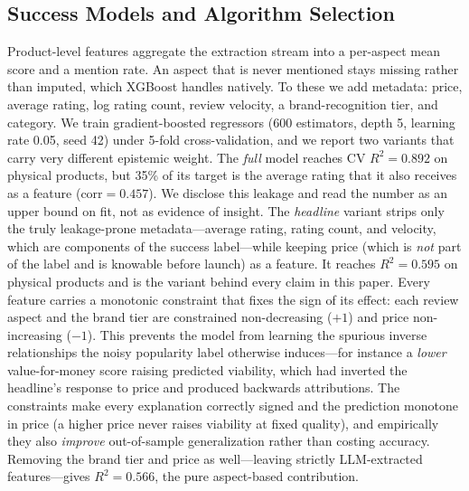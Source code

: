 \documentclass[journal]{IEEEtran}
\begin{document}
\subsection{Success Models and Algorithm Selection}
\label{sec:models}
Product-level features aggregate the extraction stream into a per-aspect mean score and a mention rate. An aspect that is never mentioned stays missing rather than imputed, which XGBoost \cite{chen2016xgboost} handles natively. To these we add metadata: price, average rating, log rating count, review velocity, a brand-recognition tier, and category. We train gradient-boosted regressors (600 estimators, depth 5, learning rate 0.05, seed 42) under 5-fold cross-validation, and we report two variants that carry very different epistemic weight. The \emph{full} model reaches CV $R^2 = 0.892$ on physical products, but 35\% of its target is the average rating that it also receives as a feature ($\text{corr} = 0.457$). We disclose this leakage and read the number as an upper bound on fit, not as evidence of insight. The \emph{headline} variant strips only the truly leakage-prone metadata---average rating, rating count, and velocity, which are components of the success label---while keeping price (which is \emph{not} part of the label and is knowable before launch) as a feature. It reaches $R^2 = 0.595$ on physical products and is the variant behind every claim in this paper. Every feature carries a monotonic constraint that fixes the sign of its effect: each review aspect and the brand tier are constrained non-decreasing ($+1$) and price non-increasing ($-1$). This prevents the model from learning the spurious inverse relationships the noisy popularity label otherwise induces---for instance a \emph{lower} value-for-money score raising predicted viability, which had inverted the headline's response to price and produced backwards attributions. The constraints make every explanation correctly signed and the prediction monotone in price (a higher price never raises viability at fixed quality), and empirically they also \emph{improve} out-of-sample generalization rather than costing accuracy. Removing the brand tier and price as well---leaving strictly LLM-extracted features---gives $R^2 = 0.566$, the pure aspect-based contribution.
\end{document}
